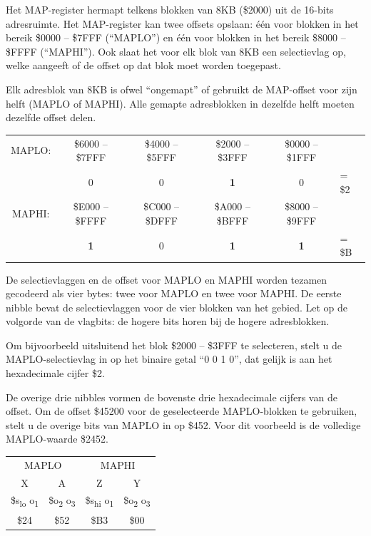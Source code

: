 Het MAP-register hermapt telkens blokken van 8KB (\$2000) uit de 16-bits adresruimte. Het MAP-register kan twee offsets opslaan: één voor blokken in het bereik \$0000 -- \$7FFF (``MAPLO'') en één voor blokken in het bereik \$8000 -- \$FFFF (``MAPHI''). Ook slaat het voor elk blok van 8KB een selectievlag op, welke aangeeft of de offset op dat blok moet worden toegepast.

Elk adresblok van 8KB is ofwel ``ongemapt'' of gebruikt de MAP-offset voor zijn helft (MAPLO of MAPHI). Alle gemapte adresblokken in dezelfde helft moeten dezelfde offset delen.

\begin{center}
\begin{tabular}{c|c|c|c|c|l}
MAPLO: & \$6000 -- \$7FFF & \$4000 -- \$5FFF & \$2000 -- \$3FFF & \$0000 -- \$1FFF & \\& 0 & 0 & {\bf 1} & 0 & = \$2 \\
\hline
MAPHI: & \$E000 -- \$FFFF & \$C000 -- \$DFFF & \$A000 -- \$BFFF & \$8000 -- \$9FFF & \\& {\bf 1} & 0 & {\bf 1} & {\bf 1} & = \$B \\
\end{tabular}
\end{center}

De selectievlaggen en de offset voor MAPLO en MAPHI worden tezamen gecodeerd als vier bytes: twee voor MAPLO en twee voor MAPHI. De eerste nibble bevat de selectievlaggen voor de vier blokken van het gebied. Let op de volgorde van de vlagbits: de hogere bits horen bij de hogere adresblokken.

Om bijvoorbeeld uitsluitend het blok \$2000 -- \$3FFF te selecteren, stelt u de MAPLO-selectievlag in op het binaire getal ``0 0 1 0'', dat gelijk is aan het hexadecimale cijfer \$2.

De overige drie nibbles vormen de bovenste drie hexadecimale cijfers van de offset. Om de offset \$45200 voor de geselecteerde MAPLO-blokken te gebruiken, stelt u de overige bits van MAPLO in op \$452. Voor dit voorbeeld is de volledige MAPLO-waarde \$2452.

\begin{center}
\begin{tabular}{cc|cc}
\multicolumn{2}{c}{MAPLO} & \multicolumn{2}{c}{MAPHI} \\X & A & Z & Y \\
\hline
\$s\textsubscript{lo} o\textsubscript{1} &\$o\textsubscript{2} o\textsubscript{3} &\$s\textsubscript{hi} o\textsubscript{1} &\$o\textsubscript{2} o\textsubscript{3} \\
\hline
\$24 & \$52 & \$B3 & \$00 \\
\end{tabular}
\end{center}

